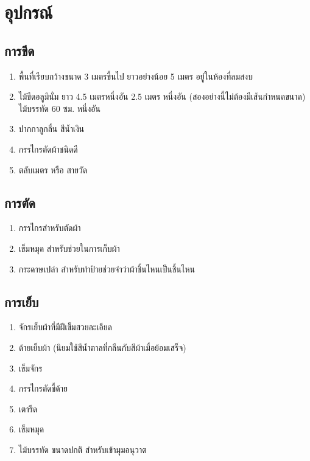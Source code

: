 \chapter{อุปกรณ์}

\section{การขีด}

\begin{enumerate}
\def\labelenumi{(\arabic{enumi})}
\item
  พื้นที่เรียบกว้างขนาด 3 เมตรขึ้นไป ยาวอย่างน้อย 5 เมตร อยู่ในห้องที่ลมสงบ
\item
  ไม้ขีดอลูมินั่ม ยาว 4.5 เมตรหนึ่งอัน 2.5 เมตร หนึ่งอัน
  (สองอย่างนี้ไม่ต้องมีเส้นกำหนดขนาด) ไม้บรรทัด 60 ซม. หนึ่งอัน
\item
  ปากกาลูกลื่น สีน้ำเงิน
\item
  กรรไกรตัดผ้าชนิดดี
\item
  ตลับเมตร หรือ สายวัด
\end{enumerate}

\section{การตัด}

\begin{enumerate}
\def\labelenumi{(\arabic{enumi})}
\item
  กรรไกรสำหรับตัดผ้า
\item
  เข็มหมุด สำหรับช่วยในการเก็บผ้า
\item
  กระดาษเปล่า สำหรับทำป้ายช่วยจำว่าผ้าชิ้นไหนเป็นชิ้นไหน
\end{enumerate}

\section{การเย็บ}

\begin{enumerate}
\def\labelenumi{(\arabic{enumi})}
\item
  จักรเย็บผ้าที่มีฝีเข็มสวยละเอียด
\item
  ด้ายเย็บผ้า (นิยมใช้สีน้ำตาลที่กลืนกับสีผ้าเมื่อย้อมเสร็จ)
\item
  เข็มจักร
\item
  กรรไกรตัดขี้ด้าย
\item
  เตารีด
\item
  เข็มหมุด
\item
  ไม้บรรทัด ขนาดปกติ สำหรับเข้ามุมอนุวาต
\end{enumerate}

